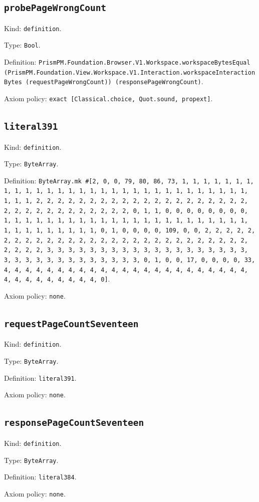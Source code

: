 \documentclass[11pt]{article}
\begin{document}
\subsection*{\texttt{probePageWrongCount}}
\noindent Kind: \texttt{definition}.\par
\noindent Type: \texttt{Bool}.\par
\noindent Definition: \texttt{PrismPM.Foundation.Browser.V1.Workspace.workspaceBytesEqual (PrismPM.Foundation.View.Workspace.V1.Interaction.workspaceInteractionBytes (requestPageWrongCount)) (responsePageWrongCount)}.\par
\noindent Axiom policy: \texttt{exact [Classical.choice, Quot.sound, propext]}.\par
\subsection*{\texttt{literal391}}
\noindent Kind: \texttt{definition}.\par
\noindent Type: \texttt{ByteArray}.\par
\noindent Definition: \texttt{ByteArray.mk \#[2, 0, 0, 79, 80, 86, 73, 1, 1, 1, 1, 1, 1, 1, 1, 1, 1, 1, 1, 1, 1, 1, 1, 1, 1, 1, 1, 1, 1, 1, 1, 1, 1, 1, 1, 1, 1, 1, 1, 1, 2, 2, 2, 2, 2, 2, 2, 2, 2, 2, 2, 2, 2, 2, 2, 2, 2, 2, 2, 2, 2, 2, 2, 2, 2, 2, 2, 2, 2, 2, 2, 2, 0, 1, 1, 0, 0, 0, 0, 0, 0, 0, 0, 1, 1, 1, 1, 1, 1, 1, 1, 1, 1, 1, 1, 1, 1, 1, 1, 1, 1, 1, 1, 1, 1, 1, 1, 1, 1, 1, 1, 1, 1, 1, 1, 0, 1, 0, 0, 0, 0, 109, 0, 0, 2, 2, 2, 2, 2, 2, 2, 2, 2, 2, 2, 2, 2, 2, 2, 2, 2, 2, 2, 2, 2, 2, 2, 2, 2, 2, 2, 2, 2, 2, 2, 2, 3, 3, 3, 3, 3, 3, 3, 3, 3, 3, 3, 3, 3, 3, 3, 3, 3, 3, 3, 3, 3, 3, 3, 3, 3, 3, 3, 3, 3, 3, 3, 3, 0, 1, 0, 0, 17, 0, 0, 0, 0, 33, 4, 4, 4, 4, 4, 4, 4, 4, 4, 4, 4, 4, 4, 4, 4, 4, 4, 4, 4, 4, 4, 4, 4, 4, 4, 4, 4, 4, 4, 4, 4, 4, 0]}.\par
\noindent Axiom policy: \texttt{none}.\par
\subsection*{\texttt{requestPageCountSeventeen}}
\noindent Kind: \texttt{definition}.\par
\noindent Type: \texttt{ByteArray}.\par
\noindent Definition: \texttt{literal391}.\par
\noindent Axiom policy: \texttt{none}.\par
\subsection*{\texttt{responsePageCountSeventeen}}
\noindent Kind: \texttt{definition}.\par
\noindent Type: \texttt{ByteArray}.\par
\noindent Definition: \texttt{literal384}.\par
\noindent Axiom policy: \texttt{none}.\par
\end{document}
